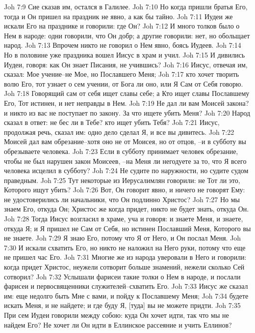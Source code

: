 Joh 7:9  Сие сказав им, остался в Галилее.
Joh 7:10  Но когда пришли братья Его, тогда и Он пришел на праздник не явно, а как бы тайно.
Joh 7:11  Иудеи же искали Его на празднике и говорили: где Он?
Joh 7:12  И много толков было о Нем в народе: одни говорили, что Он добр; а другие говорили: нет, но обольщает народ.
Joh 7:13  Впрочем никто не говорил о Нем явно, боясь Иудеев.
Joh 7:14  Но в половине уже праздника вошел Иисус в храм и учил.
Joh 7:15  И дивились Иудеи, говоря: как Он знает Писания, не учившись?
Joh 7:16  Иисус, отвечая им, сказал: Мое учение--не Мое, но Пославшего Меня;
Joh 7:17  кто хочет творить волю Его, тот узнает о сем учении, от Бога ли оно, или Я Сам от Себя говорю.
Joh 7:18  Говорящий сам от себя ищет славы себе; а Кто ищет славы Пославшему Его, Тот истинен, и нет неправды в Нем.
Joh 7:19  Не дал ли вам Моисей закона? и никто из вас не поступает по закону. За что ищете убить Меня?
Joh 7:20  Народ сказал в ответ: не бес ли в Тебе? кто ищет убить Тебя?
Joh 7:21  Иисус, продолжая речь, сказал им: одно дело сделал Я, и все вы дивитесь.
Joh 7:22  Моисей дал вам обрезание--хотя оно не от Моисея, но от отцов, --и в субботу вы обрезываете человека.
Joh 7:23  Если в субботу принимает человек обрезание, чтобы не был нарушен закон Моисеев, --на Меня ли негодуете за то, что Я всего человека исцелил в субботу?
Joh 7:24  Не судите по наружности, но судите судом праведным.
Joh 7:25  Тут некоторые из Иерусалимлян говорили: не Тот ли это, Которого ищут убить?
Joh 7:26  Вот, Он говорит явно, и ничего не говорят Ему: не удостоверились ли начальники, что Он подлинно Христос?
Joh 7:27  Но мы знаем Его, откуда Он; Христос же когда придет, никто не будет знать, откуда Он.
Joh 7:28  Тогда Иисус возгласил в храме, уча и говоря: и знаете Меня, и знаете, откуда Я; и Я пришел не Сам от Себя, но истинен Пославший Меня, Которого вы не знаете.
Joh 7:29  Я знаю Его, потому что Я от Него, и Он послал Меня.
Joh 7:30  И искали схватить Его, но никто не наложил на Него руки, потому что еще не пришел час Его.
Joh 7:31  Многие же из народа уверовали в Него и говорили: когда придет Христос, неужели сотворит больше знамений, нежели сколько Сей сотворил?
Joh 7:32  Услышали фарисеи такие толки о Нем в народе, и послали фарисеи и первосвященники служителей--схватить Его.
Joh 7:33  Иисус же сказал им: еще недолго быть Мне с вами, и пойду к Пославшему Меня;
Joh 7:34  будете искать Меня, и не найдете; и где буду Я, [туда] вы не можете придти.
Joh 7:35  При сем Иудеи говорили между собою: куда Он хочет идти, так что мы не найдем Его? Не хочет ли Он идти в Еллинское рассеяние и учить Еллинов?
